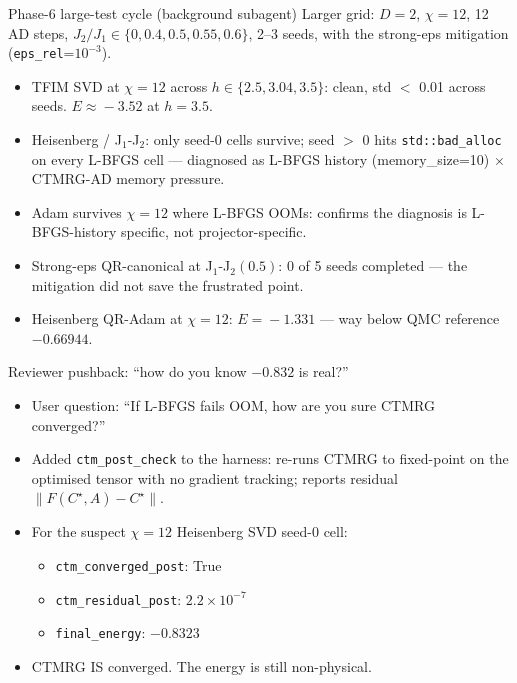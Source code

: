 \documentclass[11pt,aspectratio=169]{beamer}
\begin{document}
\begin{frame}{Phase-6 large-test cycle (background subagent)}
  Larger grid: $D=2$, $\chi=12$, 12 AD steps, $J_2/J_1\!\in\!\{0, 0.4, 0.5, 0.55, 0.6\}$, 2--3 seeds, with the strong-eps mitigation (\texttt{eps\_rel}=$10^{-3}$).
  \begin{itemize}
    \item TFIM SVD at $\chi=12$ across $h\!\in\!\{2.5, 3.04, 3.5\}$: \alert{clean}, std $<$ 0.01 across seeds. $E\!\approx\!-3.52$ at $h\!=\!3.5$.
    \item Heisenberg / J$_1$-J$_2$: only seed-0 cells survive; \alert{seed $>$ 0 hits \texttt{std::bad\_alloc}} on every L-BFGS cell --- diagnosed as L-BFGS history (memory\_size=10) $\times$ CTMRG-AD memory pressure.
    \item Adam survives $\chi=12$ where L-BFGS OOMs: confirms the diagnosis is L-BFGS-history specific, not projector-specific.
    \item Strong-eps QR-canonical at J$_1$-J$_2(0.5)$: \alert{0 of 5 seeds completed} --- the mitigation did not save the frustrated point.
    \item Heisenberg QR-Adam at $\chi=12$: $E\!=\!-1.331$ --- \alert{way below} QMC reference $-0.66944$.
  \end{itemize}
\end{frame}

\begin{frame}{Reviewer pushback: ``how do you know $-0.832$ is real?''}
  \begin{itemize}
    \item User question: ``If L-BFGS fails OOM, how are you sure CTMRG converged?''
    \pause
    \item Added \texttt{ctm\_post\_check} to the harness: re-runs CTMRG to fixed-point on the optimised tensor with \alert{no gradient tracking}; reports residual $\|F(C^\star,A){-}C^\star\|$.
    \pause
    \item For the suspect $\chi=12$ Heisenberg SVD seed-0 cell:
    \begin{itemize}
      \item \texttt{ctm\_converged\_post}: \alert{True}
      \item \texttt{ctm\_residual\_post}: $2.2 \times 10^{-7}$
      \item \texttt{final\_energy}: $\mathbf{-0.8323}$
    \end{itemize}
    \item \alert{CTMRG IS converged}. The energy is \alert{still non-physical}.
  \end{itemize}
\end{frame}
\end{document}
